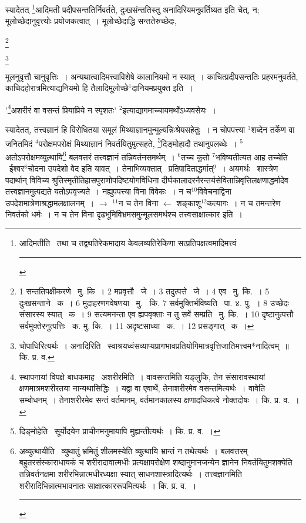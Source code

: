 \documentclass[11pt, openany]{book}
\newcommand\blfootnote[1]{%
 \begingroup
 \renewcommand\thefootnote{}\footnote{#1}%
 \addtocounter{footnote}{-1}%
 \endgroup
}
\begin{document}
स्यादेतत् \renewcommand{\thefootnote}{२}\footnote{आदिमतीति \textendash\ तथा च तद्व्यतिरेकमादाय केवलव्यतिरेकिणा सत्प्रतिपक्षत्वमादिमत्त्वं \rule{0.4\linewidth}{0.5pt}}आदिमती प्रदीपसन्ततिर्निवर्तते, दुःखसंन्ततिस्तु अनादिरियमनुवर्तिष्यत इति चेत्, न; मूलोच्छेदानुवृत्त्योः प्रयोजकत्वात्~। मूलोच्छेदाद्धि सन्ततेरुच्छेदः,

\blfootnote{ 1 सन्ततिपक्षीकरणे  \textendash\ मु. कि~। 2 मप्रवृत्तौ  \textendash\ जे~। 3 तदुत्पत्ते  \textendash\ जे~। 4 एव  \textendash\ मु. कि.~। 5 दुःखसन्ताने  \textendash\ क~। 6 मुदाहरणगवेषणया  \textendash\ मु. \textendash\ कि. 7 सर्वमुक्तिर्भविष्यति  \textendash\ पा. ४. पु.~। 8 उच्छेदः संसारस्य स्यात्  \textendash\ क~। 9 सत्यमनन्ता एव ह्यपवृक्ताः न तु सर्वे सम्प्रति  \textendash\ मु. कि.~। 10 दृष्टानुत्पत्तौ सर्वमुक्तेरनुत्पत्तिः  \textendash\ क. मु. कि.~। 11 अदृष्टसाध्या  \textendash\ क.~। 12 प्रसङ्गात्  \textendash\ क~।}

\newpage
\blfootnote{चोपाधिरित्यर्थः~। अनादिरिति  \textendash\ स्वाश्रयध्वंसव्याप्यप्रागभावप्रतियोगिमात्रवृत्तिजातिमत्त्वम*नादित्वम्~॥ कि. प्र. व.}
\noindent
मूलनुवृत्तौ चानुवृत्तिः~। अन्यथात्वादिमत्त्वाविशेषे कालानियमो न स्यात्~। काचित्प्रदीपसन्ततिः प्रहरमनुवर्तते, काचिदहोरात्रमित्याद्यनियमो हि तैलादिमूलोच्छे$^1$दानियमप्रयुक्त इति~।

'\renewcommand{\thefootnote}{१}\footnote{स्थापनायां विपक्षे बाधकमाह \textendash\ अशरीरमिति~। वावसन्तमिति यङ्लुकि, तेन संसारावस्थायां क्षणमात्रमशरीरतया नान्यथासिद्धिः~। यद्वा वा एवार्थे, तेनाशरीरमेव वसन्तमित्यर्थः~। वावेति सम्बोधनम्~। तेनाशरीरमेव सन्तं वर्तमानम्, वर्तमानकालस्य क्षणादधिकत्वे नोक्तदोषः~। कि. प्र. व.~।}अशरीरं वा वसन्तं प्रियाप्रिये न स्पृशतः' ${}^2$इत्याद्यागमाच्चायमर्थोऽध्यवसेयः~।

स्यादेतत्, तत्त्वज्ञानं हि विरोधितया समूलं मिथ्याज्ञानमुन्मूल्यन्निःश्रेयसहेतुः~। न चोपपत्त्या ${}^3$शब्देन तर्केण वा जनितमिदं ${}^4$परोक्षमपरोक्षं मिथ्याज्ञानं निवर्तयितुमुत्सहते, \renewcommand{\thefootnote}{२}\footnote{दिङ्मोहेति \textendash\ सूर्योदयेन प्राचीनमनुमायापि मुह्यन्तीत्यर्थः~। कि. प्र. व.~।}दिङ्मोहादौ तथानुपलब्धेः~। ${}^5$अतोऽपरोक्षमव्युत्थायि\renewcommand{\thefootnote}{३}\footnote{अव्युत्थायीति \textendash\ व्युथातुं भ्रमितुं शीलमस्येति व्युत्थायि भ्रान्तं न तथेत्यर्थः~। बलवत्तरम् बहुतरसंस्काराधायकं च शरीरादावात्मधीः प्रत्यक्षापरोक्षेण शब्दानुमानजन्येन ज्ञानेन निवर्तयितुमशक्येति तन्निवर्तनक्षमा शरीरभिन्नात्मधीरध्यक्षा स्यात् साधनशास्त्रादित्यर्थः~। तत्त्वज्ञानमिति शरीरादिभिन्नात्मभावनातः साक्षात्काररूपमित्यर्थः~। कि. प्र. व.~। \rule{0.4\linewidth}{0.5pt}} बलवत्तरं तत्त्वज्ञानं तन्निवर्तनसमर्थम्~। ${}^6$तच्च कुतो ${}^7$भविष्यतीत्यत आह {\knu तच्चेति} \textendash\ ईश्वर$^8$चोदना उपदेशो वेद इति यावत्~। तेनाभिव्यक्तात् \textendash\ प्रतिपादिताद्धर्मात्$^9$~। अयमर्थः \textendash\ शास्त्रेण पदार्थान् विविच्य श्रुतिस्मृतीतिहासपुराणोपदिष्टयोगविधिना दीर्घकालादरनैरन्तर्यसेवितान्निवृत्तिलक्षणाद्धर्मादेव तत्त्वज्ञानमुत्पद्यते यतोऽपवृज्यते~। नह्युपपत्त्या विना विवेकः~। न च${}^10$विवेचनाद्विना उपदेशमात्रेणाश्रद्धामलक्षालनम्~। $\rightarrow$ ${}^11$न च तेन विना $\leftarrow$ शङ्काशू$^12$कत्यागः~। न च तमन्तरेण निवर्तको धर्मः~। न च तेन विना दृढभूमिविभ्रमसमुन्मूलसमर्थश्च तत्त्वसाक्षात्कार इति~।
\end{document}
